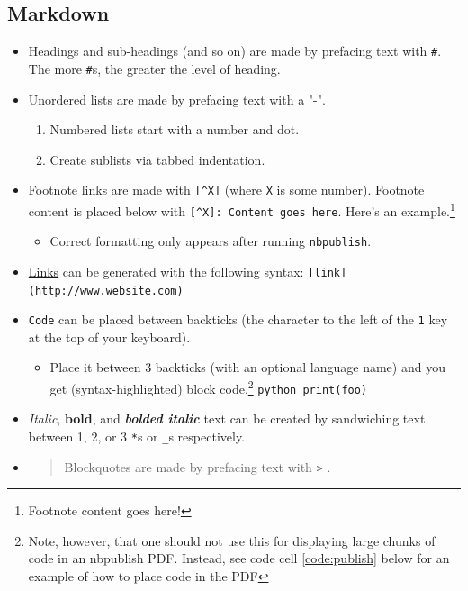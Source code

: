 \documentclass[10pt,parskip=half,
	toc=sectionentrywithdots,
	bibliography=totocnumbered,
	captions=tableheading,
    numbers=noendperiod,
    headings=standardclasses]{scrartcl}
\providecommand{\tightlist}{%
  \setlength{\itemsep}{0pt}\setlength{\parskip}{0pt}}
\begin{document}
\subsection{Markdown}\label{markdown}

\begin{itemize}
\item
  Headings and sub-headings (and so on) are made by prefacing text with
  \texttt{\#}. The more \texttt{\#}s, the greater the level of heading.
\item
  Unordered lists are made by prefacing text with a "-".

  \begin{enumerate}
  \def\labelenumi{\arabic{enumi}.}
  \tightlist
  \item
    Numbered lists start with a number and dot.
  \item
    Create sublists via tabbed indentation.
  \end{enumerate}
\item
  Footnote links are made with \texttt{{[}\^{}X{]}} (where \texttt{X} is
  some number). Footnote content is placed below with
  \texttt{{[}\^{}X{]}:\ Content\ goes\ here}. Here's an
  example.\footnote{\hphantom{} Footnote content goes here!}

  \begin{itemize}
  \tightlist
  \item
    Correct formatting only appears after running \texttt{nbpublish}.
  \end{itemize}
\item
  \href{https://google.com}{Links} can be generated with the following
  syntax: \texttt{{[}link{]}(http://www.website.com)}
\item
  \texttt{Code} can be placed between backticks (the character to the
  left of the \texttt{1} key at the top of your keyboard).

  \begin{itemize}
  \tightlist
  \item
    Place it between 3 backticks (with an optional language name) and
    you get (syntax-highlighted) block code.\footnote{\hphantom{} Note,
      however, that one should not use this for displaying large chunks
      of code in an nbpublish PDF. Instead, see code cell
      \cref{code:publish} below for an example of how to place code in
      the PDF} \texttt{python\ print(foo)}
  \end{itemize}
\item
  \emph{Italic}, \textbf{bold}, and \textbf{\emph{bolded italic}} text
  can be created by sandwiching text between 1, 2, or 3 \texttt{*}s or
  \texttt{\_}s respectively.
\item
  \begin{quote}
  Blockquotes are made by prefacing text with \texttt{\textgreater{}} .
  \end{quote}
\end{itemize}
\end{document}
